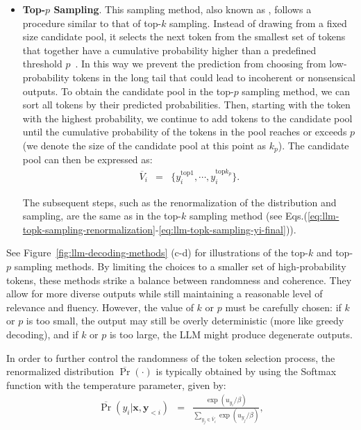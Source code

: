 \begin{itemize}
\item \vspace{0.3em} \textbf{Top-$p$ Sampling}. This sampling method, also known as , follows a procedure similar to that of top-$k$ sampling. Instead of drawing from a fixed size candidate pool, it selects the next token from the smallest set of tokens that together have a cumulative probability higher than a predefined threshold $p$~\cite{holtzman-etal:2020the}. In this way we prevent the prediction from choosing from low-probability tokens in the long tail that could lead to incoherent or nonsensical outputs. To obtain the candidate pool in the top-$p$ sampling method, we can sort all tokens by their predicted probabilities. Then, starting with the token with the highest probability, we continue to add tokens to the candidate pool until the cumulative probability of the tokens in the pool reaches or exceeds $p$ (we denote the size of the candidate pool at this point as $k_p$). The candidate pool can then be expressed as:
    \begin{eqnarray}
    \overline{V}_i & = & \{y_i^{\mathrm{top}1},\cdots,y_i^{\mathrm{top}{k_p}}\}.
    \end{eqnarray}

    The subsequent steps, such as the renormalization of the distribution and sampling, are the same as in the top-$k$ sampling method (see Eqs.(\ref{eq:llm-topk-sampling-renormalization}-\ref{eq:llm-topk-sampling-yi-final})).
\end{itemize}
\vspace{0.5em}

See Figure~\ref{fig:llm-decoding-methods} (c-d) for illustrations of the top-$k$ and top-$p$ sampling methods. By limiting the choices to a smaller set of high-probability tokens, these methods strike a balance between randomness and coherence. They allow for more diverse outputs while still maintaining a reasonable level of relevance and fluency. However, the value of $k$ or $p$ must be carefully chosen: if $k$ or $p$ is too small, the output may still be overly deterministic (more like greedy decoding), and if $k$ or $p$ is too large, the LLM might produce degenerate outputs.

In order to further control the randomness of the token selection process, the renormalized distribution $\overline{\Pr}(\cdot)$ is typically obtained by using the Softmax function with the temperature parameter, given by:
\begin{eqnarray}
\overline{\Pr}(y_i|\mathbf{x},\mathbf{y}_{<i}) & = & \frac{\exp(u_{y_i}/\beta)}{\sum_{y_j \in \overline{V}_i} \exp(u_{y_j}/\beta)},
\end{eqnarray}

